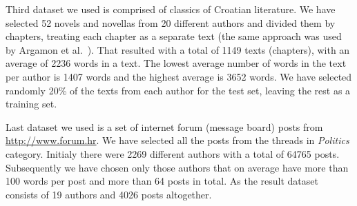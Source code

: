\documentclass{llncs}
\begin{document}
Third dataset we used is comprised of classics of Croatian literature. We have
selected 52 novels and novellas from 20 different authors and divided them by
chapters, treating each chapter as a separate text (the same approach was used by
Argamon et al.\ \cite{argamon2005measuring}). That resulted with a total of 1149
texts (chapters), with an average of 2236 words in a text. The lowest average
number of words in the text per author is 1407 words and the highest average is
3652 words. We have selected randomly 20\% of the texts from each
author for the test set, leaving the rest as a training set.

Last dataset we used is a set of internet forum (message board) posts from
\url{http://www.forum.hr}. We have selected all the posts from the threads in
\textit{Politics} category. Initialy there were 2269 different authors with a
total of 64765 posts. Subsequently we have chosen only those authors that on
average have more than 100 words per post and more than 64 posts in total. As the
result dataset consists of 19 authors and 4026 posts altogether.


\begin{minipage}{0.8\linewidth}
\vspace{10pt}
\centerline{\resizebox{0.7\linewidth}{!}{}}%
%
\label{fig:articlesPerAuthor}
\end{minipage}
\end{document}

